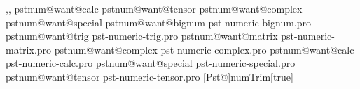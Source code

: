 \expandafter\pstnum@mark\pstNumericParts,\relax,
\ifcsname pstnum@want@calc\endcsname{}\fi
\ifcsname pstnum@want@tensor\endcsname{}\fi
\ifcsname pstnum@want@complex\endcsname{}\fi
\ifcsname pstnum@want@special\endcsname{}\fi
%
\def\pstnum@load#1{%
  \ifcsname pstnum@want@#1\endcsname
    \expandafter\pstheader\else\expandafter\pstnum@gobble\fi
  {pst-numeric-#1.pro}}
\pstnum@load{bignum}
\pstnum@load{trig}
\pstnum@load{matrix}
\pstnum@load{complex}
\pstnum@load{calc}
\pstnum@load{special}
\pstnum@load{tensor}
%
\def\pstNumericDict{tx@NumericDict}
\def\pstNumeric#1{ tx@NumericDict begin #1 end }
%
[Pst@]{numTrim}[true]{}
